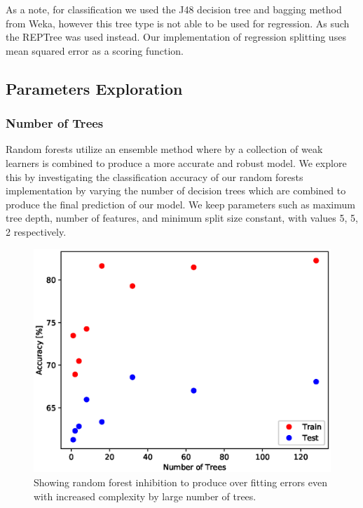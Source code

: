 \documentclass{article} %
\begin{document}
As a note, for classification we used the J48 decision tree and bagging method from Weka, however this tree type is not able to be used for regression. As such the REPTree was used instead. Our implementation of regression splitting uses mean squared error as a scoring function.\cite{Brieman84}

\subsection{Parameters Exploration}

\subsubsection{Number of Trees}

Random forests utilize an ensemble method where by a collection of weak learners is combined to produce a more accurate and robust model. We explore this by investigating the classification accuracy of our random forests implementation by varying the number of decision trees which are combined to produce the final prediction of our model. We keep parameters such as maximum tree depth, number of features, and minimum split size constant, with values 5, 5, 2 respectively.

\begin{figure}[ht]
\begin{center}
\includegraphics[scale=0.4]{n_trees}
\end{center}
\caption{Showing random forest inhibition to produce over fitting errors even with increased complexity by large number of trees.}
\label{fig:n_trees}
\end{figure}
\end{document}
